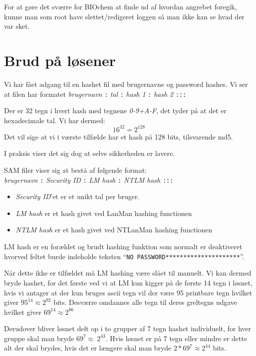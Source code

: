 \documentclass[10pt,a4paper,danish]{article}
\begin{document}
For at gøre det sværre for BIOchem at finde ud af hvordan angrebet foregik,
kunne man som root have slettet/redigeret loggen så man ikke kan se hvad der var
sket.


\section{Brud på løsener}

Vi har fået adgang til en hashet fil med brugernavne og password hashes.
Vi ser at filen har formatet \textit{brugernavn} \texttt{:} \textit{tal}
\texttt{:} \textit{hash 1} \texttt{:} \textit{hash 2} \texttt{:::}

Der er 32 tegn i hvert hash med tegnene \textit{0-9+A-F}, det tyder på at det er
hexadecimale tal. Vi har dermed:
\[16^{32} = 2^{128}\]
Det vil sige at vi i værste tilfælde har et hash på 128 bits, tilsvarende md5.

I praksis viser det sig dog at selve sikkerheden er lavere.

SAM filer viser sig at bestå af følgende format\cite{cracking}:\\
\textit{brugernavn} \texttt{:} \textit{Security ID}
\texttt{:} \textit{LM hash} \texttt{:} \textit{NTLM hash} \texttt{:::}
\begin{itemize}
\item \textit{Security ID}'et er et unikt tal per bruger.
\item \textit{LM hash} er et hash givet ved LanMan hashing functionen
\item \textit{NTLM hash} er et hash givet ved NTLanMan hashing functionen
\end{itemize}

LM hash er en forældet og brudt hashing funktion som normalt er deaktiveret
hvorved feltet burde indeholde teksten ``\texttt{NO
  PASSWORD*********************}''.

Når dette ikke er tilfældet må LM hashing være slået til manuelt.
Vi kan dermed bryde hashet, for det første ved vi at LM kun kigger på de første
14 tegn i løsnet, hvis vi antager at der kun bruges ascii tegn vil der være 95
printbare tegn hvilket giver \(95^{14} \approx 2^{92}\) bits.
Desværre omdannes alle tegn til deres greltegns udgave hvilket giver \(69^{14}
\approx 2^{86}\)

Derudover bliver løsnet delt op i to grupper af 7 tegn hashet individuelt,
for hver gruppe skal man bryde \(69^{7} \approx \ 2^{43}\).
Hvis løsnet er på 7 tegn eller mindre er dette alt der skal brydes, hvis det er
længere skal man bryde \(2 * 69^{7} \approx 2^{44}\) bits.
\end{document}
